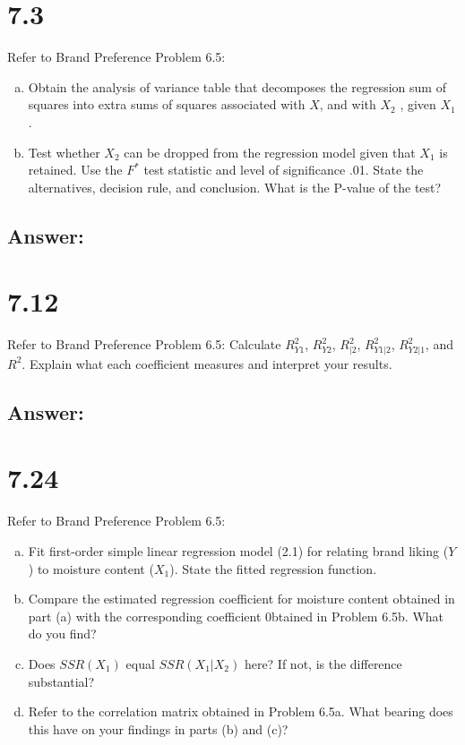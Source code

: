 \documentclass{article}
\begin{document}
\section{7.3}

Refer to Brand Preference Problem 6.5:

\begin{enumerate}[a)]
\item{} Obtain the analysis of variance table that decomposes the regression sum of squares into extra sums of squares associated with $X$, and with $X_2$ , given $X_1$.
\item{} Test whether $X_2$ can be dropped from the regression model given that $X_1$ is retained. Use the $F^*$ test statistic and level of significance .01. State the alternatives, decision rule, and conclusion. What is the P-value of the test?
\end{enumerate}

\subsection{Answer:}

\section{7.12}

Refer to Brand Preference Problem 6.5: Calculate $R_{Y1}^2$, $R_{Y2}^2$, $R_{|2}^2$, $R_{Y1|2}^2$, $R_{Y2|1}^2$, and $R^2$. Explain what each coefficient measures and interpret your results.

\subsection{Answer:}

\section{7.24}

Refer to Brand Preference Problem 6.5:

\begin{enumerate}[a)]
\item{} Fit first-order simple linear regression model (2.1) for relating brand liking ($Y$) to moisture content ($X_1$). State the fitted regression function.
\item{} Compare the estimated regression coefficient for moisture content obtained in part (a) with the corresponding coefficient 0btained in Problem 6.5b. What do you find?
\item{} Does $SSR(X_1)$ equal $SSR(X_1|X_2)$ here? If not, is the difference substantial?
\item{} Refer to the correlation matrix obtained in Problem 6.5a. What bearing does this have on your findings in parts (b) and (c)?
\end{enumerate}
\end{document}
